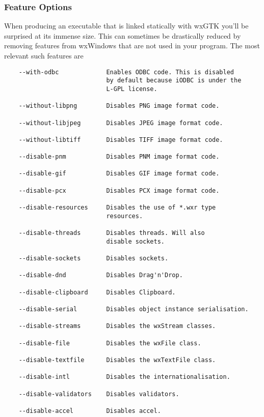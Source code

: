 \subsubsection{Feature Options}

When producing an executable that is linked statically with wxGTK
you'll be surprised at its immense size. This can sometimes be
drastically reduced by removing features from wxWindows that 
are not used in your program. The most relevant such features
are

\begin{verbatim}
	--with-odbc             Enables ODBC code. This is disabled
                            by default because iODBC is under the
                            L-GPL license.
	
	--without-libpng	    Disables PNG image format code.
	
	--without-libjpeg	    Disables JPEG image format code.
	
	--without-libtiff	    Disables TIFF image format code.
    
	--disable-pnm		    Disables PNM image format code.
	
	--disable-gif		    Disables GIF image format code.
	
	--disable-pcx		    Disables PCX image format code.
	
    --disable-resources     Disables the use of *.wxr type
	                        resources.
		
	--disable-threads       Disables threads. Will also
	                        disable sockets.

	--disable-sockets       Disables sockets.

	--disable-dnd           Disables Drag'n'Drop.
	
	--disable-clipboard     Disables Clipboard.
	
	--disable-serial        Disables object instance serialisation.
	
	--disable-streams       Disables the wxStream classes.
	
	--disable-file          Disables the wxFile class.
	
	--disable-textfile      Disables the wxTextFile class.
	
	--disable-intl          Disables the internationalisation.
	
	--disable-validators    Disables validators.
	
	--disable-accel         Disables accel.
\end{verbatim}
	

